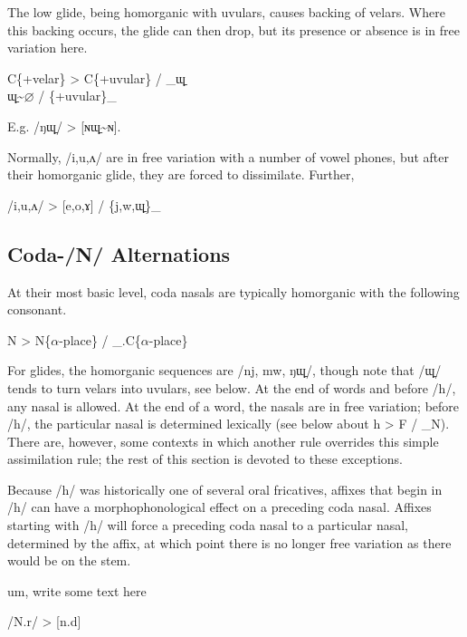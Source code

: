 \documentclass[12pt]{book} %
\begin{document}
The low glide, being homorganic with uvulars, causes backing of velars.
Where this backing occurs, the glide can then drop, but its presence or absence is in free variation here.
\begin{center}
	C\{+velar\} > C\{+uvular\} / \_ɰ̠ \\

	ɰ̠\textasciitilde{}$\varnothing$ / \{+uvular\}\_
\end{center}
E.g. /ŋɰ̠/ > [ɴɰ̠\textasciitilde{}ɴ].

Normally, /i,u,ʌ/ are in free variation with a number of vowel phones, but after their homorganic glide, they are forced to dissimilate.
Further, 
\begin{center}
	/i,u,ʌ/ > [e,o,ɤ] / \{j,w,ɰ̠\}\_
\end{center}

\subsection{Coda-/N/ Alternations}

At their most basic level, coda nasals are typically homorganic with the following consonant.
\begin{center}
	N > N\{$\alpha$-place\} / \_.C\{$\alpha$-place\}
\end{center}
For glides, the homorganic sequences are /nj, mw, ŋɰ̠/, though note that /ɰ̠/ tends to turn velars into uvulars, {\color{orange}see below}.
At the end of words and before /h/, any nasal is allowed.
At the end of a word, the nasals are in free variation; {\color{red}before /h/, the particular nasal is determined lexically (see below about h > F / \_N)}.
There are, however, some contexts in which another rule overrides this simple assimilation rule; the rest of this section is devoted to these exceptions.

Because /h/ was historically one of several oral fricatives, affixes that begin in /h/ can have a morphophonological effect on a preceding coda nasal.
Affixes starting with /h/ will force a preceding coda nasal to a particular nasal, determined by the affix, at which point there is no longer free variation as there would be on the stem.

{\color{cyan}
um, write some text here
\begin{center}
	/N.r/ > [n.d] \\
\end{center}
}
\end{document}

